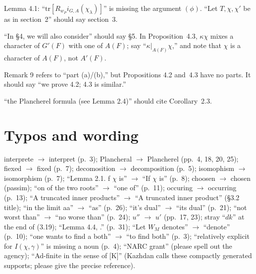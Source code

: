 \documentclass[11pt]{article}
\begin{document}
\begin{description}[leftmargin=1.2em,style=nextline]
\item[p.~26] Lemma 4.1: ``$\mathrm{tr}[R_{w_P}i_{G,A}(\chi_\lambda)]$'' is missing the argument $(\phi)$. ``Let $T,\chi,\chi'$ be as in section~2'' should say section~3.
\item[p.~27] ``In \S4, we will also consider'' should say \S5. In Proposition~4.3, $\kappa\chi$ mixes a character of $G'(F)$ with one of $A(F)$; say ``$\kappa|_{A(F)}\chi$,'' and note that $\chi$ is a character of $A(F)$, not $A'(F)$.
\item[p.~28] Remark 9 refers to ``part (a)/(b),'' but Propositions 4.2 and~4.3 have no parts. It should say ``we prove 4.2; 4.3 is similar.''
\item[p.~30] ``the Plancherel formula (see Lemma 2.4)'' should cite Corollary~2.3.
\end{description}

\section{Typos and wording}
\noindent
interprete $\to$ interpret (p.~3);
Plancheral $\to$ Plancherel (pp.~4, 18, 20, 25);
fiexed $\to$ fixed (p.~7);
decomosition $\to$ decomposition (p.~5);
isomophism $\to$ isomorphism (p.~7);
``Lemma 2.1. f $\chi$ is'' $\to$ ``If $\chi$ is'' (p.~8);
choosen $\to$ chosen (passim);
``on of the two roots'' $\to$ ``one of'' (p.~11);
occuring $\to$ occurring (p.~13);
``A truncated inner products'' $\to$ ``A truncated inner product'' (\S3.2 title);
``in the limit aa'' $\to$ ``as'' (p.~26);
``it's dual'' $\to$ ``its dual'' (p.~21);
``not worst than'' $\to$ ``no worse than'' (p.~24);
$u''$ $\to$ $u'$ (pp.~17, 23);
stray ``$dk$'' at the end of (3.19);
``Lemma 4.4, .'' (p.~31);
``Let $W_M$ denotes'' $\to$ ``denote'' (p.~10);
``one wants to find a both'' $\to$ ``to find both'' (p.~3);
``relatively explicit for $I(\chi,\gamma)$'' is missing a noun (p.~4);
``NARC grant'' (please spell out the agency);
``Ad-finite in the sense of [K]'' (Kazhdan calls these compactly generated supports; please give the precise reference).
\end{document}

